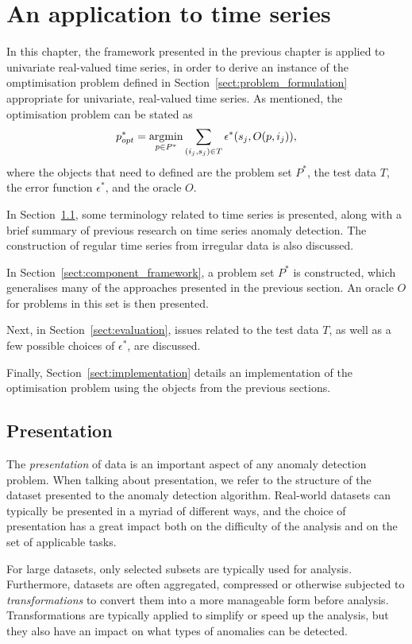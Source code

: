 \chapter{An application to time series}
\label{ch:time_series}

In this chapter, the framework presented in the previous chapter is applied to univariate real-valued time series, in order to derive an instance of the omptimisation problem defined in Section~\ref{sect:problem_formulation} appropriate for univariate, real-valued time series. As mentioned, the optimisation problem can be stated as
\[
    p^*_{opt} = \argmin_{p \in P^*} \sum_{(i_j, s_j) \in T} \epsilon^*(s_j, O(p, i_j)),
\]
where the objects that need to defined are the problem set $P^*$, the test data $T$, the error function $\epsilon^*$, and the oracle $O$.

In Section~\ref{sect:background}, some terminology related to time series is presented, along with a brief summary of previous research on time series anomaly detection. The construction of regular time series from irregular data is also discussed.

In Section~\ref{sect:component_framework}, a problem set $P^*$ is constructed, which generalises many of the approaches presented in the previous section. An oracle $O$ for problems in this set is then presented.

Next, in Section~\ref{sect:evaluation}, issues related to the test data $T$, as well as a few possible choices of $\epsilon^*$, are discussed.

Finally, Section~\ref{sect:implementation} details an implementation of the optimisation problem using the objects from the previous sections.

\section{Presentation}
\label{sect:background}

The \emph{presentation} of data is an important aspect of any anomaly detection problem. When talking about presentation, we refer to the structure of the dataset presented to the anomaly detection algorithm. Real-world datasets can typically be presented in a myriad of different ways, and the choice of presentation has a great impact both on the difficulty of the analysis and on the set of applicable tasks.

For large datasets, only selected subsets are typically used for analysis. Furthermore, datasets are often aggregated, compressed or otherwise subjected to \emph{transformations} to convert them into a more manageable form before analysis. Transformations are typically applied to simplify or speed up the analysis, but they also have an impact on what types of anomalies can be detected.

